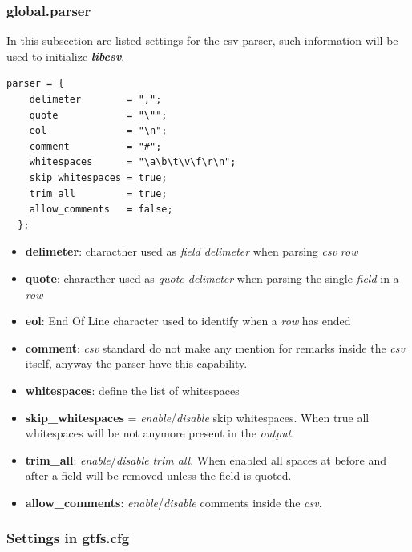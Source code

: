 \documentclass[12pt, a4paper]{book}
\begin{document}
\newpage
\subsubsection{global.parser}

In this subsection are listed settings for the csv parser, such information will be used to initialize \href{https://github.com/fe-dagostino/libcsv}{\textit{\textbf{libcsv}}}.

\begin{small}
\begin{lstlisting}[backgroundcolor=\color{gray},frame=single]
  parser = {
    delimeter        = ",";
    quote            = "\"";
    eol              = "\n";
    comment          = "#";
    whitespaces      = "\a\b\t\v\f\r\n";
    skip_whitespaces = true;
    trim_all         = true;
    allow_comments   = false;
  };
\end{lstlisting}
\end{small}

\begin{itemize}
\item \textbf{delimeter}: characther used as \textit{field delimeter} when parsing \textit{csv} \textit{row}
\item \textbf{quote}: characther used as \textit{quote delimeter} when parsing the single \textit{field} in a \textit{row}
\item \textbf{eol}: End Of Line character used to identify when a \textit{row} has ended
\item \textbf{comment}: \textit{csv} standard do not make any mention for remarks inside the \textit{csv} itself, anyway the parser have this capability. 
\item \textbf{whitespaces}: define the list of whitespaces
\item \textbf{skip\_whitespaces} = \textit{enable}/\textit{disable} skip whitespaces. When true all whitespaces will be not anymore present in the \textit{output}.
\item \textbf{trim\_all}: \textit{enable}/\textit{disable} \textit{trim all}. When enabled all spaces at before and after a field will be removed unless the field is quoted.
\item \textbf{allow\_comments}: \textit{enable}/\textit{disable} comments inside the \textit{csv}.
\end{itemize}

\newpage
\subsubsection{Settings in \textbf{gtfs.cfg}}
\end{document}
